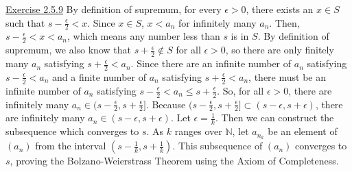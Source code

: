 \documentclass{exam}
\begin{document}
\underline{Exercise 2.5.9}
\newline
\newline
By definition of supremum, for every $\epsilon>0$, there exists an $x\in S$ such that $s-\frac{\epsilon}{2}<x$. Since $x\in S$, $x<a_n$ for infinitely many $a_n$. Then, $s-\frac{\epsilon}{2}<x<a_n$, which means any number less than $s$ is in $S$. By definition of supremum, we also know that $s+\frac{\epsilon}{2}\notin S$ for all $\epsilon>0$, so there are only finitely many $a_n$ satisfying $s+\frac{\epsilon}{2}<a_n$. Since there are an infinite number of $a_n$ satisfying $s-\frac{\epsilon}{2}<a_n$ and a finite number of $a_n$ satisfying $s+\frac{\epsilon}{2}<a_n$, there must be an infinite number of $a_n$ satisfying $s-\frac{\epsilon}{2}<a_n\le s+\frac{\epsilon}{2}$. So, for all $\epsilon>0$, there are infinitely many $a_n\in(s-\frac{\epsilon}{2}, s+\frac{\epsilon}{2}]$. Because $(s-\frac{\epsilon}{2},s+\frac{\epsilon}{2}]\subset(s-\epsilon, s+\epsilon)$, there are infinitely many $a_n\in(s-\epsilon, s+\epsilon)$. Let $\epsilon=\frac{1}{k}$. Then we can construct the subsequence which converges to $s$. As $k$ ranges over $\mathbb{N}$, let $a_{n_k}$ be an element of $(a_n)$ from the interval $(s-\frac{1}{k}, s+\frac{1}{k})$. This subsequence of $(a_n)$ converges to $s$, proving the Bolzano-Weierstrass Theorem using the Axiom of Completeness.
\newline
\end{document}
